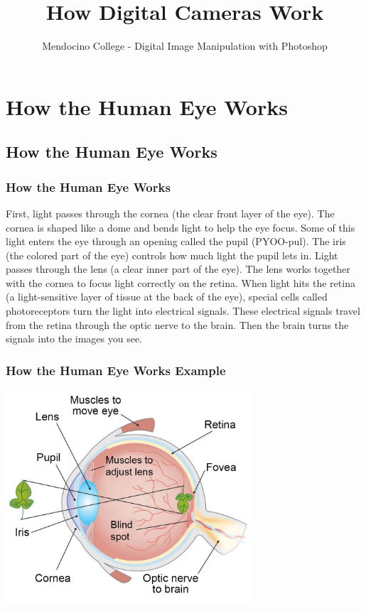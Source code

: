 \documentclass{beamer}
\title{How Digital Cameras Work}
\author{Mendocino College - Digital Image Manipulation with Photoshop}
\date{\vspace{-5em}}
\begin{document}
	{
		\begin{frame}
			\vspace{-35pt}
			\maketitle
		\end{frame}
	}
		
\section{How the Human Eye Works}

\subsection{How the Human Eye Works}		

\begin{frame}
	\frametitle{How the Human Eye Works}
	\begin{outline}
		\1 First, light passes through the cornea (the clear front layer of the eye). 
		\2 The cornea is shaped like a dome and bends light to help the eye focus.
		\1 Some of this light enters the eye through an opening called the pupil (PYOO-pul). 
		\2 The iris (the colored part of the eye) controls how much light the pupil lets in.
		\1 Light passes through the lens (a clear inner part of the eye). 
		\2 The lens works together with the cornea to focus light correctly on the retina.
		\1 When light hits the retina (a light-sensitive layer of tissue at the back of the eye), special cells called \2 photoreceptors turn the light into electrical signals.
		\1 These electrical signals travel from the retina through the optic nerve to the brain. 
		\2 Then the brain turns the signals into the images you see.
	\end{outline}
\end{frame}

\begin{frame}
	\frametitle{How the Human Eye Works Example}
	\begin{center}
		\includegraphics[width=0.69\textwidth]{images/eye-anatomy-1000.jpg}
	\end{center}
\end{frame}
\end{document}
